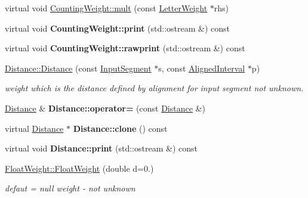 \begin{DoxyCompactItemize}
\item 
virtual void \mbox{\hyperlink{group__weight_ga102af16b814daad826afb91d6f6c75b3}{Counting\+Weight\+::mult}} (const \mbox{\hyperlink{classLetterWeight}{Letter\+Weight}} $\ast$rhs)
\item 
\mbox{\label{group__weight_ga00d9ffa71ae947eb191e118570049b73}} 
virtual void {\bfseries Counting\+Weight\+::print} (std\+::ostream \&) const
\item 
\mbox{\label{group__weight_ga30707b9335976941e15aef45c4db86bf}} 
virtual void {\bfseries Counting\+Weight\+::rawprint} (std\+::ostream \&) const
\item 
\mbox{\label{group__weight_ga4ebd2ecbdf6955d1ed9064d391cc71b7}} 
\mbox{\hyperlink{group__weight_ga4ebd2ecbdf6955d1ed9064d391cc71b7}{Distance\+::\+Distance}} (const \mbox{\hyperlink{classInputSegment}{Input\+Segment}} $\ast$s, const \mbox{\hyperlink{classAlignedInterval}{Aligned\+Interval}} $\ast$p)
\begin{DoxyCompactList}\small\item\em weight which is the distance defined by alignment for input segment not unknown. \end{DoxyCompactList}\item 
\mbox{\label{group__weight_gaf54b8155e1a7652461400d4dd0a5739f}} 
\mbox{\hyperlink{classDistance}{Distance}} \& {\bfseries Distance\+::operator=} (const \mbox{\hyperlink{classDistance}{Distance}} \&)
\item 
\mbox{\label{group__weight_gafb8da4bc0d0e23217ecad4c219d9a610}} 
virtual \mbox{\hyperlink{classDistance}{Distance}} $\ast$ {\bfseries Distance\+::clone} () const
\item 
\mbox{\label{group__weight_gaf9785af97fcce45a15098363efe5b7c8}} 
virtual void {\bfseries Distance\+::print} (std\+::ostream \&) const
\item 
\mbox{\label{group__weight_ga7eed0253fd20af20e3fec8dc2f4652b8}} 
\mbox{\hyperlink{group__weight_ga7eed0253fd20af20e3fec8dc2f4652b8}{Float\+Weight\+::\+Float\+Weight}} (double d=0.)
\begin{DoxyCompactList}\small\item\em defaut = null weight -\/ not unknown \end{DoxyCompactList}\item 

\end{DoxyCompactItemize}
